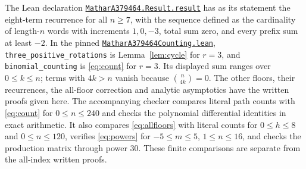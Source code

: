 \documentclass[11pt]{article}
\begin{document}
The Lean declaration
\href{https://github.com/the-omega-institute/trureturing/blob/03150b25ffad5ced1bebdca2efc8c05b484c1eca/D5/S1/Recurrence/MatharA379464/Result.lean}{\texttt{MatharA379464.Result.result}}
has as its statement the eight-term recurrence for all $n\geq7$, with
the sequence defined as the cardinality of length-$n$ words with increments
$1,0,-3$, total sum zero, and every prefix sum at least $-2$.
In the pinned
\href{https://github.com/the-omega-institute/trureturing/blob/03150b25ffad5ced1bebdca2efc8c05b484c1eca/D5/S1/Words/LatticePaths/MatharA379464Counting.lean}{\texttt{MatharA379464Counting.lean}},
\texttt{three\_positive\_rotations} is Lemma~\ref{lem:cycle} for $r=3$,
and \texttt{binomial\_counting} is \eqref{eq:count} for $r=3$.
Its displayed sum ranges over $0\leq k\leq n$; terms with $4k>n$ vanish
because $\binom{n}{4k}=0$. The other floors, their recurrences, the
all-floor correction and analytic asymptotics have the written proofs given
here. The accompanying checker compares
literal path counts with \eqref{eq:count} for $0\leq n\leq240$ and checks
the polynomial differential identities in exact arithmetic. It also compares
\eqref{eq:allfloors} with literal counts for $0\leq h\leq8$ and
$0\leq n\leq120$, verifies \eqref{eq:powers} for $-5\leq m\leq5$,
$1\leq n\leq16$, and checks the production matrix through power $30$.
These finite comparisons are separate from the all-index written proofs.

\appendix
\end{document}
